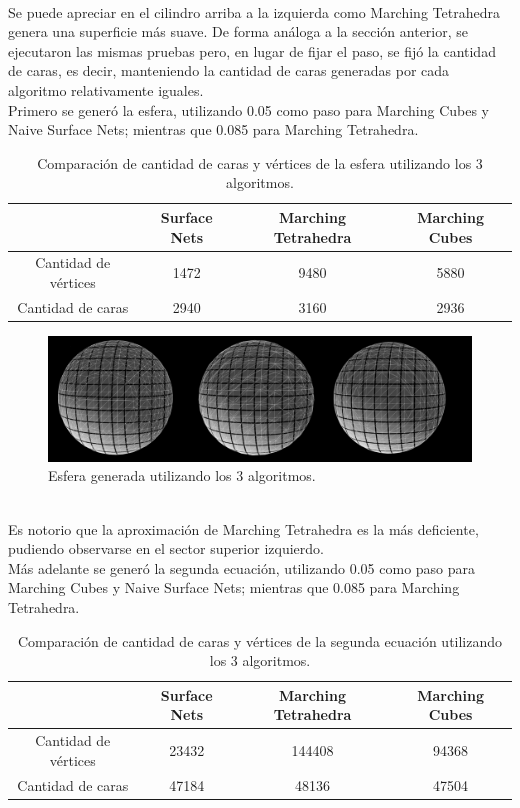 \documentclass[12pt]{article}
\begin{document}
\\Se puede apreciar en el cilindro arriba a la izquierda como Marching Tetrahedra genera una superficie más suave.
\clearpage
De forma análoga a la sección anterior, se ejecutaron las mismas pruebas pero, en lugar de fijar el paso, se fijó la cantidad de caras, es decir, manteniendo la cantidad de caras generadas por cada algoritmo relativamente iguales.
\\Primero se generó la esfera, utilizando 0.05 como paso para Marching Cubes y Naive Surface Nets; mientras que 0.085 para Marching Tetrahedra.
\begin{table}[h!]
  \centering
  \label{tab:table1}
  \begin{tabular}{cccc}
    \toprule
    & Surface Nets & Marching Tetrahedra & Marching Cubes\\
    \midrule
    Cantidad de vértices & 1472 & 9480  & 5880 \\
    Cantidad de caras &  2940 & 3160 & 2936 \\
    \bottomrule
  \end{tabular}
  \caption{Comparación de cantidad de caras y vértices de la esfera utilizando los 3 algoritmos.}
\end{table}
\begin{figure}[h!]
\includegraphics[width=\linewidth,center]{esfera2.png}
\caption{Esfera generada utilizando los 3 algoritmos.}
\end{figure}
\\Es notorio que la aproximación de Marching Tetrahedra es la más deficiente, pudiendo observarse en el sector superior izquierdo.
\\Más adelante se generó la segunda ecuación, utilizando 0.05 como paso para Marching Cubes y Naive Surface Nets; mientras que 0.085 para Marching Tetrahedra.
\begin{table}[h!]
  \centering
  \label{tab:table1}
  \begin{tabular}{cccc}
    \toprule
    & Surface Nets & Marching Tetrahedra & Marching Cubes\\
    \midrule
    Cantidad de vértices & 23432 & 144408  & 94368 \\
    Cantidad de caras &  47184 & 48136 & 47504 \\
    \bottomrule
  \end{tabular}
  \caption{Comparación de cantidad de caras y vértices de la segunda ecuación utilizando los 3 algoritmos.}
\end{table}
\end{document}
